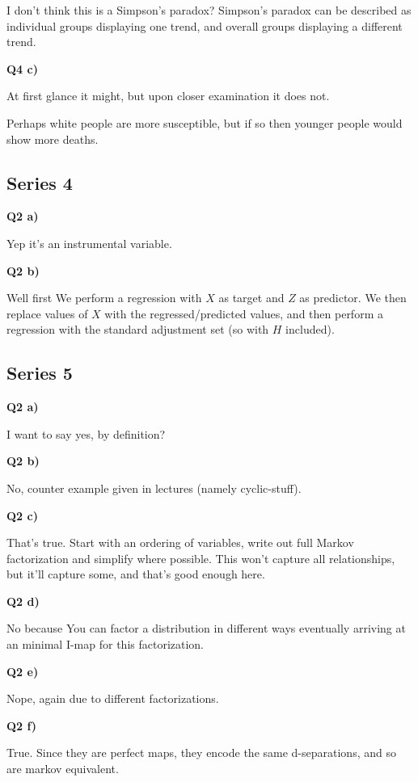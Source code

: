 \documentclass{article}
\begin{document}
			I don't think this is a Simpson's paradox? Simpson's paradox can be described as individual groups displaying one trend, and overall groups displaying a different trend. 
			
		\textbf{Q4 c)}

			At first glance it might, but upon closer examination it does not.
			
			Perhaps white people are more susceptible, but if so then younger people would show more deaths.
			
	\subsection{Series 4}
	
		\textbf{Q2  a)}
			
			Yep it's an instrumental variable.
			
		\textbf{Q2 b)}
			
			Well first We perform a regression with $X$ as target and $Z$ as predictor. We then replace values of $X$ with the regressed/predicted values, and then perform a regression with the standard adjustment set (so with $H$ included).
			
	\subsection{Series 5}
	
		\textbf{Q2 a)}
		
			I want to say yes, by definition? 
			
		\textbf{Q2 b)}
			
			No, counter example given in lectures (namely cyclic-stuff).
			
	
		\textbf{Q2 c)}
		
			That's true. Start with an ordering of variables, write out full Markov factorization and simplify where possible. This won't capture all relationships, but it'll capture some, and that's good enough here.
			
		\textbf{Q2 d)}
			
			No because You can factor a distribution in different ways eventually arriving at an minimal I-map for this factorization.
			
		\textbf{Q2 e)}
		
			Nope, again due to different factorizations.
			
		\textbf{Q2 f)}
		
			True. Since they are perfect maps, they encode the same d-separations, and so are markov equivalent.
			
\end{document}
